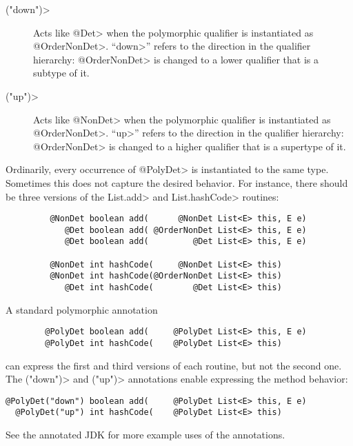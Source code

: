\begin{description}
\item[\<("down")>]
  Acts like \<@Det> when the polymorphic qualifier is instantiated as
  \<@OrderNonDet>.
  ``\<down>'' refers to the direction in the qualifier hierarchy:
  \<@OrderNonDet> is changed to a lower qualifier that is a subtype of it.
\item[\<("up")>]
  Acts like \<@NonDet> when the polymorphic qualifier is instantiated as
  \<@OrderNonDet>.
  ``\<up>'' refers to the direction in the qualifier hierarchy:
  \<@OrderNonDet> is changed to a higher qualifier that is a supertype of it.
\end{description}

Ordinarily, every occurrence of \<@PolyDet> is instantiated to the same
type.  Sometimes this does not capture the desired behavior.  For instance,
there should be three versions of the \<List.add> and \<List.hashCode> routines:

\begin{Verbatim}
         @NonDet boolean add(      @NonDet List<E> this, E e)
            @Det boolean add( @OrderNonDet List<E> this, E e)
            @Det boolean add(         @Det List<E> this, E e)

         @NonDet int hashCode(     @NonDet List<E> this)
         @NonDet int hashCode(@OrderNonDet List<E> this)
            @Det int hashCode(        @Det List<E> this)
\end{Verbatim}

A standard polymorphic annotation

\begin{Verbatim}
        @PolyDet boolean add(     @PolyDet List<E> this, E e)
        @PolyDet int hashCode(    @PolyDet List<E> this)
\end{Verbatim}

\noindent
can express the first and third versions of each routine, but not the
second one.  The \<("down")> and
\<("up")> annotations enable
expressing the method behavior:

\begin{Verbatim}
@PolyDet("down") boolean add(     @PolyDet List<E> this, E e)
  @PolyDet("up") int hashCode(    @PolyDet List<E> this)
\end{Verbatim}

See the annotated JDK for more example uses of the annotations.

